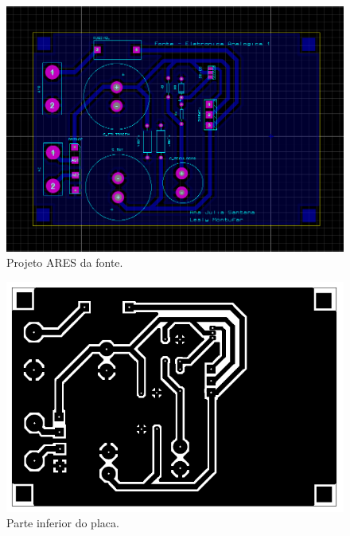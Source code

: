 \documentclass[a4paper,12pt,oneside,openany,table,xcdraw]{article}
\begin{document}
\begin{figure}[H]
\centering
\captionsetup{font=scriptsize}
\includegraphics[width=15cm]{ares}
\caption{Projeto ARES da fonte.}
\label{ares}
\end{figure}

\begin{figure}[H]
\centering
\captionsetup{font=scriptsize}
\includegraphics[width=15cm]{bottom}
\caption{Parte inferior do placa.}
\label{bottom}
\end{figure}
\end{document}
